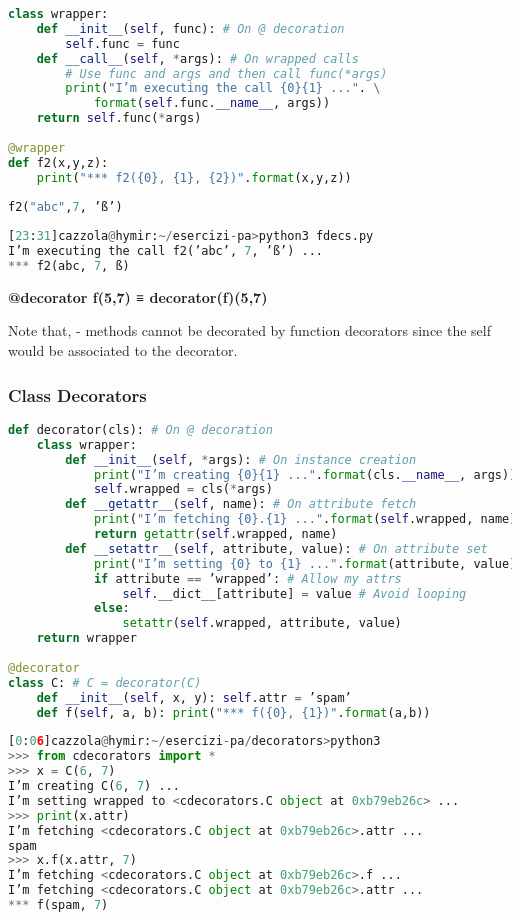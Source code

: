 \begin{lstlisting}[language=Python]
class wrapper:
	def __init__(self, func): # On @ decoration
		self.func = func
	def __call__(self, *args): # On wrapped calls
		# Use func and args and then call func(*args)
		print("I’m executing the call {0}{1} ...". \
			format(self.func.__name__, args))
	return self.func(*args)
	
@wrapper
def f2(x,y,z):
	print("*** f2({0}, {1}, {2})".format(x,y,z))
	
f2("abc",7, ’ß’)
\end{lstlisting}

\begin{lstlisting}[language=Python]
[23:31]cazzola@hymir:~/esercizi-pa>python3 fdecs.py
I’m executing the call f2(’abc’, 7, ’ß’) ...
*** f2(abc, 7, ß)
\end{lstlisting}

\textbf{@decorator f(5,7) ≡ decorator(f)(5,7)}

Note that,
- methods cannot be decorated by function decorators since the self would be associated to the decorator.

\subsubsection{Class Decorators}

\begin{lstlisting}[language=Python]
def decorator(cls): # On @ decoration
	class wrapper:
		def __init__(self, *args): # On instance creation
			print("I’m creating {0}{1} ...".format(cls.__name__, args))
			self.wrapped = cls(*args)
		def __getattr__(self, name): # On attribute fetch
			print("I’m fetching {0}.{1} ...".format(self.wrapped, name))
			return getattr(self.wrapped, name)
		def __setattr__(self, attribute, value): # On attribute set
			print("I’m setting {0} to {1} ...".format(attribute, value))
			if attribute == ’wrapped’: # Allow my attrs
				self.__dict__[attribute] = value # Avoid looping
			else:
				setattr(self.wrapped, attribute, value)
	return wrapper
	
@decorator
class C: # C = decorator(C)
	def __init__(self, x, y): self.attr = ’spam’
	def f(self, a, b): print("*** f({0}, {1})".format(a,b))
\end{lstlisting}

\begin{lstlisting}[language=Python]
[0:06]cazzola@hymir:~/esercizi-pa/decorators>python3
>>> from cdecorators import *
>>> x = C(6, 7)
I’m creating C(6, 7) ...
I’m setting wrapped to <cdecorators.C object at 0xb79eb26c> ...
>>> print(x.attr)
I’m fetching <cdecorators.C object at 0xb79eb26c>.attr ...
spam
>>> x.f(x.attr, 7)
I’m fetching <cdecorators.C object at 0xb79eb26c>.f ...
I’m fetching <cdecorators.C object at 0xb79eb26c>.attr ...
*** f(spam, 7)
\end{lstlisting}

